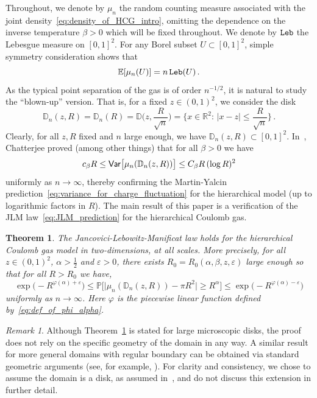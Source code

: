 \documentclass[11pt]{amsart}
\newtheorem{theorem}{Theorem}
\theoremstyle{definition}
\theoremstyle{remark}
\newtheorem*{remark*}{Remark}
\numberwithin{equation}{section}
\def\eps{{\varepsilon}}
\newcommand{\bR}{\mathbb R}
\newcommand{\bD}{\mathbb D}
\newcommand{\bP}{\mathbb P}
\newcommand{\bE}{\mathbb E}
\newcommand{\Var}{{\sf Var}}
\begin{document}
	Throughout, we denote by $\mu_n$ the random counting measure associated with the joint density~\eqref{eq:density_of_HCG_intro}, omitting the dependence on the inverse temperature $\beta>0$ which will be fixed throughout. We denote by ${\tt Leb}$ the Lebesgue measure on $[0,1]^2$. For any Borel subset $U\subset [0,1]^2$, simple symmetry consideration shows that
	\begin{equation}
		\label{eq:introdution_expectation_of_mu_n}
		\bE[\mu_n(U)] = n \, {\tt Leb} (U) \, .
	\end{equation}
	As the typical point separation of the gas is of order $n^{-1/2}$, it is natural to study the ``blown-up'' version. That is, for a fixed $z\in (0,1)^2$, we consider the disk
	\begin{equation*}
		\bD_n(z,R) = \bD_n(R) = \bD\Big(z,\frac{R}{\sqrt{n}}\Big) = \Big\{x\in \bR^2 : \, |x-z|\le \frac{R}{\sqrt{n}}\Big\}\, .
	\end{equation*}
	Clearly, for all $z,R$ fixed and $n$ large enough, we have $\bD_n(z,R)\subset [0,1]^2$. In~\cite{chatterjee}, Chatterjee proved (among other things) that for all $\beta>0$ we have
	\begin{equation*}
		c_\beta R \le \Var\big[\mu_n(\bD_n(z,R))\big] \le C_\beta R \, (\log R)^2
	\end{equation*}
	uniformly as $n\to \infty$, thereby confirming the Martin-Yalcin prediction~\eqref{eq:variance_for_charge_fluctuation} for the hierarchical model (up to logarithmic factors in $R$). The main result of this paper is a verification of the JLM law~\eqref{eq:JLM_prediction} for the hierarchical Coulomb gas.
	
	\begin{theorem}
		\label{thm:Micro_JLM}
		The Jancovici-Lebowitz-Manificat law holds for the hierarchical Coulomb gas model in two-dimensions, at all scales. More precisely, for all $z\in(0,1)^2$, $\alpha>\tfrac{1}{2}$ and $\eps>0$, there exists $R_0=R_0(\alpha,\beta,z,\eps)$ large enough so that for all $R>R_0$ we have,
		\[
		\exp\Big(-R^{\varphi(\alpha)+\eps}\Big) \le \bP\Big[\big|\mu_n(\bD_n(z,R)) - \pi R^2\big| \ge R^\alpha \Big] \le \exp\Big(-R^{\varphi(\alpha)-\eps}\Big)
		\]
		uniformly as $n\to\infty$. Here $\varphi$ is the piecewise linear function defined by~\eqref{eq:def_of_phi_alpha}.
	\end{theorem}
	\begin{remark*}
		Although Theorem~\ref{thm:Micro_JLM} is stated for large microscopic disks, the proof does not rely on the specific geometry of the domain in any way. A similar result for more general domains with regular boundary can be obtained via standard geometric arguments (see, for example, \cite[Lemma~3.12]{chatterjee}). For clarity and consistency, we chose to assume the domain is a disk, as assumed in~\cite{JLM}, and do not discuss this extension in further detail.
	\end{remark*}
\end{document}
